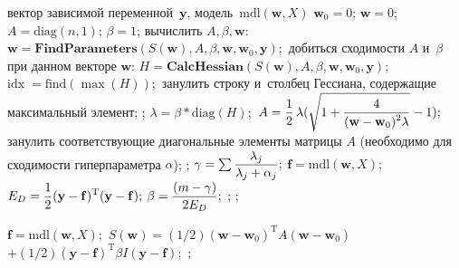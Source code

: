 \begin{multicols}{2}
\begin{algorithmic}
\REQUIRE вектор зависимой переменной~$\mathbf{y}$, модель~$\text{mdl}(\mathbf{w}, X)$
\STATE $\mathbf{w}_0=0$;
\STATE $\mathbf{w}=0$;
\STATE $A = \text{diag}(n,1)$;
\STATE $\beta=1$;
 вычислить $A, \beta, \mathbf{w}:$
    \STATE$\mathbf{w}=\textbf{FindParameters}(S(\mathbf{w}), A, \beta, \mathbf{w}, \mathbf{w}_0, \mathbf{y});$
     добиться сходимости $A$ и~$\beta$ при данном векторе $\mathbf{w}$:
            \STATE$H=\textbf{CalcHessian}(S(\mathbf{w}), A, \beta, \mathbf{w}, \mathbf{w}_0, \mathbf{y});$
                \STATE$\mathrm{idx}\;= \text{find} (\max(H));$ 
                \STATE занулить строку и~столбец Гессиана, содержащие максимальный элемент;
            \ENDIF
            \EXIT ;
            \STATE$\lambda=\beta*\text{diag}(H);$
            \STATE$A=\displaystyle\frac{\displaystyle 1\mathstrut}{\displaystyle 2\mathstrut}\,\lambda(\sqrt{1+\displaystyle\frac{\displaystyle 4\mathstrut}{\displaystyle (\mathbf{w}-\mathbf{w}_0)^{2}\lambda\mathstrut}}-1);$
                \STATE занулить соответствующие диагональные элементы матрицы $A$ (необходимо для сходимости гиперпараметра $\alpha$);
            \ENDIF
            \EXIT ;
            \STATE$\gamma=\sum \displaystyle\frac{\displaystyle \lambda_j\mathstrut}{\displaystyle \lambda_j + \alpha_j\mathstrut};$
            \STATE$\mathbf{f}=\text{mdl}(\mathbf{w},X);$
            \STATE$E_D=\displaystyle\frac{\displaystyle 1\mathstrut}{\displaystyle 2\mathstrut}(\mathbf{y}-\mathbf{f})^{\mathrm{T}}(\mathbf{y}-\mathbf{f});$
            \STATE$\beta = \displaystyle\frac{\displaystyle (m - \gamma)\mathstrut}{\displaystyle 2 E_D\mathstrut};$
            \ENDIF
            \EXIT ;
            \ENDIF
            \EXIT;
    \ENDFOR
    \ENDIF
\ENDFOR
\OUT
\end{algorithmic}

\vspace*{-12pt}

\begin{algorithmic}
        \STATE$\mathbf{f} = \text{mdl}(\mathbf{w}, X);$
        \STATE$S(\mathbf{w}) = ({1}/{2})(\mathbf{w}-\mathbf{w}_0)^{\mathrm{T}}
        A(\mathbf{w}-\mathbf{w}_0)$
        \STATE$+({1}/{2})(\mathbf{y}-\mathbf{f})^{\mathrm{T}}\beta I(\mathbf{y}-\mathbf{f});$
    \ENDWHILE
    \EXIT ;
\end{algorithmic}


\end{multicols}
